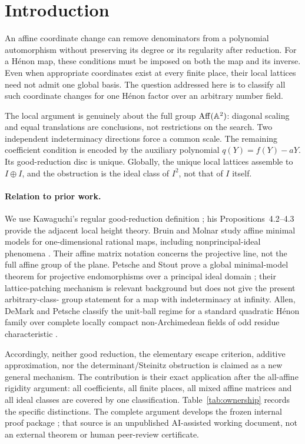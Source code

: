 \section{Introduction}

An affine coordinate change can remove denominators from a polynomial
automorphism without preserving its degree or its regularity after
reduction. For a H\'enon map, these conditions must be imposed on both
the map and its inverse. Even when appropriate coordinates exist at
every finite place, their local lattices need not admit one global
basis. The question addressed here is to classify all such coordinate
changes for one H\'enon factor over an arbitrary number field.

The local argument is genuinely about the full group
$\operatorname{Aff}(\mathbb A^2)$: diagonal scaling and equal translations are
conclusions, not restrictions on the search. Two independent
indeterminacy directions force a common scale. The remaining
coefficient condition is encoded by the auxiliary polynomial
$q(Y)=f(Y)-aY$. Its good-reduction disc is unique. Globally, the unique
local lattices assemble to $I\oplus I$, and the obstruction is the
ideal class of $I^2$, not that of $I$ itself.

\paragraph{Relation to prior work.}
We use Kawaguchi's regular good-reduction definition
\cite[Definition~4.1]{Kawaguchi2013}; his
Propositions~4.2--4.3 provide the adjacent local height theory.
Bruin and Molnar study affine minimal models for one-dimensional
rational maps, including nonprincipal-ideal phenomena
\cite[Proposition~2.10 and Section~6]{BruinMolnar2012}.
Their affine matrix notation concerns the projective line, not the
full affine group of the plane. Petsche and Stout prove a global
minimal-model theorem for projective endomorphisms over a principal
ideal domain \cite{PetscheStout2014}; their lattice-patching mechanism
is relevant background but does not give the present arbitrary-class-
group statement for a map with indeterminacy at infinity.
Allen, DeMark and Petsche classify the unit-ball regime for a standard
quadratic H\'enon family over complete locally compact
non-Archimedean fields of odd residue characteristic
\cite[Theorem~11]{AllenDeMarkPetsche2018}.

Accordingly, neither good reduction, the elementary escape criterion,
additive approximation, nor the determinant/Steinitz obstruction is
claimed as a new general mechanism. The contribution is their exact
application after the all-affine rigidity argument: all coefficients,
all finite places, all mixed affine matrices and all ideal classes are
covered by one classification. Table~\ref{tab:ownership} records the
specific distinctions. The complete argument develops the frozen
internal proof package \cite{GR5WorkingNotes}; that source is an
unpublished AI-assisted working document, not an external theorem or
human peer-review certificate.

